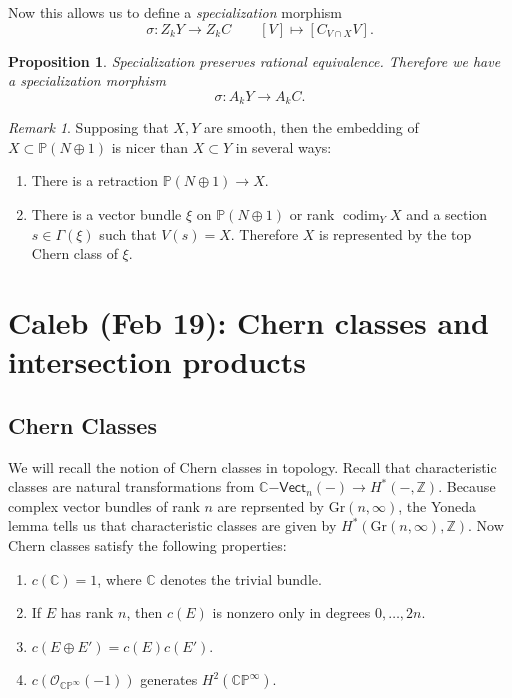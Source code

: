 \documentclass[leqno, openany]{memoir}
\newtheorem{prop}[thm]{Proposition}
\theoremstyle{definition}
\theoremstyle{remark}
\newtheorem{rmk}[thm]{Remark}
\theoremstyle{plain}
\theoremstyle{definition}
\theoremstyle{remark}
\newcommand{\C}{\mathbb{C}}
\newcommand{\Z}{\mathbb{Z}}
\renewcommand{\P}{\mathbb{P}}
\newcommand{\mc}[1]{\mathcal{#1}}
\newcommand{\mr}[1]{\mathrm{#1}}
\newcommand{\ms}[1]{\mathsf{#1}}
\begin{document}
Now this allows us to define a \textit{specialization} morphism
\[ \sigma \colon Z_k Y \to Z_k C \qquad [V] \mapsto [C_{V \cap X} V]. \]
\begin{prop}
    Specialization preserves rational equivalence. Therefore we have a specialization morphism
    \[ \sigma \colon A_k Y \to A_k C. \]
\end{prop}

\begin{rmk}
    Supposing that $X, Y$ are smooth, then the embedding of $X \subset \P(N \oplus 1)$ is nicer than $X \subset Y$ in several ways:
    \begin{enumerate}
        \item There is a retraction $\P(N \oplus 1) \to X$.
        \item There is a vector bundle $\xi$ on $\P(N \oplus 1)$ or rank $\operatorname{codim}_Y X$ and a section $s \in \Gamma(\xi)$ such that $V(s) = X$. Therefore $X$ is represented by the top Chern class of $\xi$.
    \end{enumerate}
\end{rmk}

\chapter{Caleb (Feb 19): Chern classes and intersection products}%
\label{cha:caleb_feb_19_chern_classes_and_intersection_products}

\section{Chern Classes}%
\label{sec:chern_classes}

We will recall the notion of Chern classes in topology. Recall that characteristic classes are natural transformations from $\C\ms{-Vect}_n(-) \to H^*(-, \Z)$. Because complex vector bundles of rank $n$ are reprsented by $\mr{Gr}(n, \infty)$, the Yoneda lemma tells us that characteristic classes are given by $H^*(\mr{Gr}(n, \infty), \Z)$. Now Chern classes satisfy the following properties:
\begin{enumerate}
    \item $c(\C) = 1$, where $\C$ denotes the trivial bundle.
    \item If $E$ has rank $n$, then $c(E)$ is nonzero only in degrees $0, \ldots, 2n$.
    \item $c(E \oplus E') = c(E) c(E')$.
    \item $c(\mc{O}_{\C\P^{\infty}}(-1))$ generates $H^2(\C\P^{\infty})$.
\end{enumerate}
\end{document}
